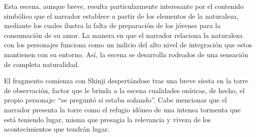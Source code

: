 
Esta escena, aunque breve, resulta particularmente interesante por el contenido simbólico que el narrador establece a partir de los elementos de la naturaleza, mediante los cuales ilustra la falta de preparación de los jóvenes para la consumación de su amor.
La manera en que el narrador relaciona la naturaleza con los personajes funciona como un indicio del alto nivel de integración que estos mantienen con su entorno. 
Así, la escena se desarrolla rodeados de una sensación de completa naturalidad.

El fragmento comienza con Shinji despertándose tras una breve siesta en la torre de observación, factor que le brinda a la escena cualidades oníricas, de hecho, el propio personaje: ``se preguntó si estaba soñando''.\autocite{mishima2006}
Cabe mencionar que el narrador presenta la torre como el refugio idóneo de una intensa tormenta que está teniendo lugar, misma que presagia la relevancia y viveza de los acontecimientos que tendrán lugar.


